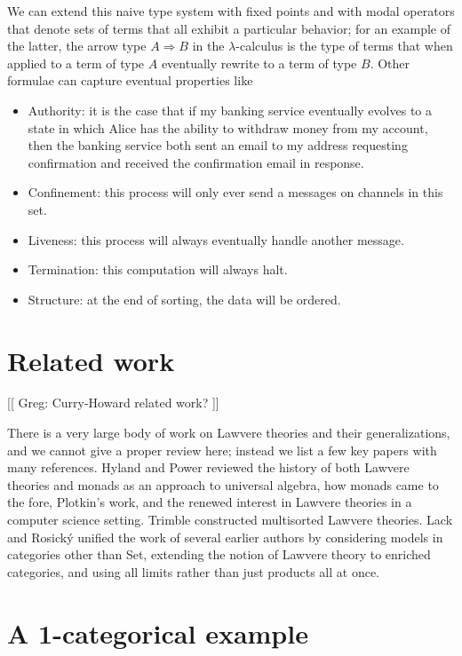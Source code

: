 \documentclass{llncs}
\begin{document}
  We can extend this naive type system with fixed points and with modal operators that denote sets of terms that all exhibit a particular behavior; for an example of the latter, the arrow type $A \Rightarrow B$ in the $\lambda$-calculus is the type of terms that when applied to a term of type $A$ eventually rewrite to a term of type $B$.  Other formulae can capture eventual properties like
\begin{itemize}
  \item Authority: it is the case that if my banking service eventually evolves to a state in which Alice has the ability to withdraw money from my account, then the banking service both sent an email to my address requesting confirmation and received the confirmation email in response.
  \item Confinement: this process will only ever send a messages on channels in this set.
  \item Liveness: this process will always eventually handle another message.
  \item Termination: this computation will always halt.
  \item Structure: at the end of sorting, the data will be ordered.
\end{itemize}

\section{Related work}
[[ Greg: Curry-Howard related work? ]]

There is a very large body of work on Lawvere theories and their generalizations, and we cannot give a proper review here; instead we list a few key papers with many references.  Hyland and Power \cite{DBLP:journals/entcs/HylandP07} reviewed the history of both Lawvere theories and monads as an approach to universal algebra, how monads came to the fore, Plotkin's work, and the renewed interest in Lawvere theories in a computer science setting.  Trimble \cite{Trimble} constructed multisorted Lawvere theories.  Lack and Rosick\'y \cite{DBLP:journals/acs/LackR11} unified the work of several earlier authors by considering models in categories other than Set, extending the notion of Lawvere theory to enriched categories, and using all limits rather than just products all at once.

\section{A 1-categorical example}
\end{document}
